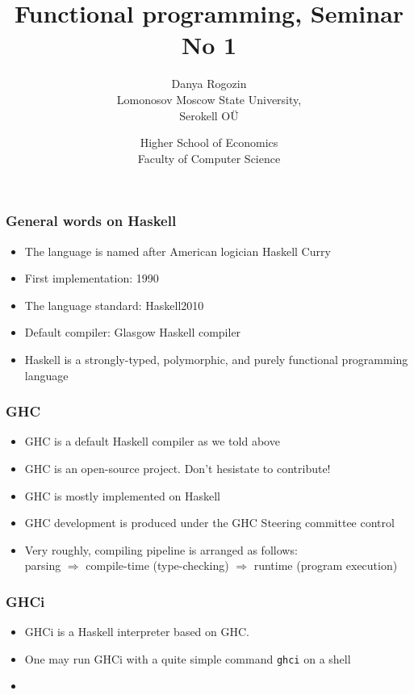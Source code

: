 \documentclass[10pt,pdf,utf8,russian,aspectratio=169]{beamer}
\title{Functional programming, Seminar No 1}
\author{Danya Rogozin \\ Lomonosov Moscow State University, \\ Serokell O\"{U}}
\date{Higher School of Economics \\ Faculty of Computer Science}
\begin{document}
\maketitle

\begin{frame}
  \frametitle{General words on Haskell}

  \begin{itemize}
    \item The language is named after American logician Haskell Curry
    \item First implementation: 1990
    \item The language standard: Haskell2010
    \item Default compiler: Glasgow Haskell compiler
    \item Haskell is a strongly-typed, polymorphic, and purely functional programming language
  \end{itemize}
\end{frame}

\begin{frame}
  \frametitle{GHC}

  \begin{itemize}
    \item GHC is a default Haskell compiler as we told above
    \item GHC is an open-source project. Don't hesistate to contribute!
    \item GHC is mostly implemented on Haskell
    \item GHC development is produced under the GHC Steering committee control
    \item Very roughly, compiling pipeline is arranged as follows: \\ parsing $\Rightarrow$ compile-time (type-checking)
    $\Rightarrow$ runtime (program execution)
  \end{itemize}
\end{frame}

\begin{frame}
  \frametitle{GHCi}

  \begin{itemize}
    \item GHCi is a Haskell interpreter based on GHC.
    \item One may run GHCi with a quite simple command \verb"ghci" on a shell
    \item
  \end{itemize}
\end{frame}
\end{document}
